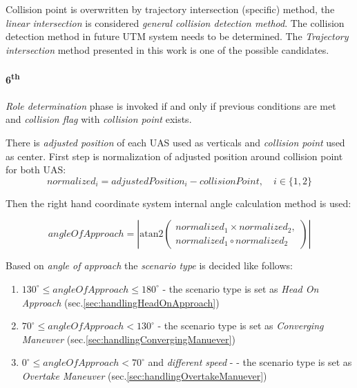 \begin{note}
    Collision point is overwritten by trajectory intersection (specific) method, the \emph{linear intersection} is considered \emph{general collision detection method}. The collision detection method in future UTM system needs to be determined. The \emph{Trajectory intersection} method presented in this work is one of the possible candidates. 
\end{note}

\paragraph{6\textsuperscript{th}} \emph{Role determination} phase is invoked if and only if previous conditions are met and \emph{collision flag} with \emph{collision point} exists.

There is \emph{adjusted position} of each UAS used as verticals and \emph{collision point} used as center. First step is normalization of adjusted position around collision point for both UAS:
\begin{equation}
    normalized_i =  adjustedPosition_i - collisionPoint,\quad i \in \{1, 2\}
\end{equation}

Then the right hand coordinate system internal angle calculation method is used:


\begin{equation}
    angleOfApproach = \left|\text{atan2}\left(\begin{gathered}normalized_1 \times normalized_2, \\normalized_1 \circ normalized_2\end{gathered}\right)\right|
\end{equation}

\noindent Based on \emph{angle of approach} the \emph{scenario type} is  decided like follows:
\begin{enumerate}
    \item $130^\circ \le angle Of Approach  \le 180^\circ$ - the scenario type is set as \emph{Head On Approach} (sec.\ref{sec:handlingHeadOnApproach})
    \item $70^\circ \le angle Of Approach  < 130^\circ$ - the scenario type is set as \emph{Converging Maneuver} (sec.\ref{sec:handlingConvergingManuever})
    \item $0^\circ \le angle Of Approach  < 70^\circ$ and \emph{different speed} -   - the scenario type is set as \emph{Overtake Maneuver} (sec.\ref{sec:handlingOvertakeManuever})
\end{enumerate}

